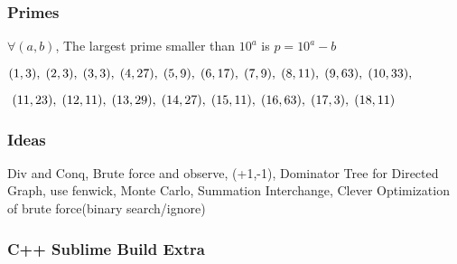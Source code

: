 \documentclass[12pt]{extarticle}
\begin{document}
\begin{multicols*}{2}
	\subsubsection*{Primes}
	$\forall (a,b)$, The largest prime smaller than $10^a$ is $p = 10^{a} - b$
	\newline 
	\par
	$(1,3), \hspace{1mm}(2,3), \hspace{1mm}(3,3), \hspace{1mm}(4,27), \hspace{1mm}(5,9), \hspace{1mm}(6,17), \hspace{1mm}(7,9), \hspace{1mm}(8,11), \hspace{1mm}(9,63), \hspace{1mm}(10,33),$
		\newline 
	\par
	$ \hspace{1mm}(11,23), \hspace{1mm}(12,11), \hspace{1mm}(13,29), \hspace{1mm}(14,27), \hspace{1mm}(15,11), \hspace{1mm}(16,63), \hspace{1mm}(17,3), \hspace{1mm}(18,11)$
	\par\vskip 3pt
	\subsubsection*{Ideas}
	Div and Conq, Brute force and observe, (+1,-1), Dominator Tree for Directed Graph, use fenwick, Monte Carlo, Summation Interchange, Clever Optimization of brute force(binary search/ignore)
	
	\subsubsection*{C++ Sublime Build Extra}
	\raggedbottom
	\vfill

		\end{multicols*}
\end{document}
